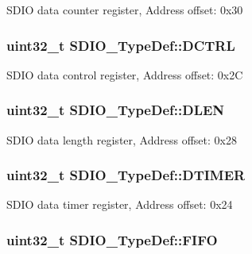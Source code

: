 S\-D\-I\-O data counter register, Address offset\-: 0x30 \hypertarget{struct_s_d_i_o___type_def_a801519a7af801ad43b88007bf4e2e906}{
\subsubsection[{D\-C\-T\-R\-L}]{ uint32\-\_\-t S\-D\-I\-O\-\_\-\-Type\-Def\-::\-D\-C\-T\-R\-L}}\label{struct_s_d_i_o___type_def_a801519a7af801ad43b88007bf4e2e906}
S\-D\-I\-O data control register, Address offset\-: 0x2\-C \hypertarget{struct_s_d_i_o___type_def_aa98ab507ed05468ca4baccd1731231cd}{
\subsubsection[{D\-L\-E\-N}]{ uint32\-\_\-t S\-D\-I\-O\-\_\-\-Type\-Def\-::\-D\-L\-E\-N}}\label{struct_s_d_i_o___type_def_aa98ab507ed05468ca4baccd1731231cd}
S\-D\-I\-O data length register, Address offset\-: 0x28 \hypertarget{struct_s_d_i_o___type_def_a5af1984c7c00890598ca74fc85449f9f}{
\subsubsection[{D\-T\-I\-M\-E\-R}]{ uint32\-\_\-t S\-D\-I\-O\-\_\-\-Type\-Def\-::\-D\-T\-I\-M\-E\-R}}\label{struct_s_d_i_o___type_def_a5af1984c7c00890598ca74fc85449f9f}
S\-D\-I\-O data timer register, Address offset\-: 0x24 \hypertarget{struct_s_d_i_o___type_def_ab4757027388ea3a0a6f114d7de2ed4cf}{
\subsubsection[{F\-I\-F\-O}]{ uint32\-\_\-t S\-D\-I\-O\-\_\-\-Type\-Def\-::\-F\-I\-F\-O}}\label{struct_s_d_i_o___type_def_ab4757027388ea3a0a6f114d7de2ed4cf}
